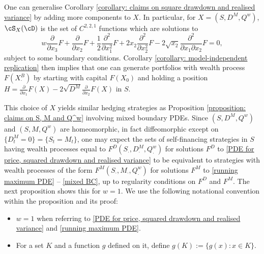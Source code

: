 \documentclass[11pt]{article}
\begin{document}
One can generalise Corollary \ref{corollary: claims on square drawdown and realised variance} by adding more components to $X$. In particular, for $X = (S, D^M, Q^w)$, $\cS_X(\cD)$ is the set of $C^{2,2,1}$ functions which are solutions to
\begin{equation}
\label{PDE for price, squared drawdown and realised variance}
w \frac{\partial}{\partial x_3} F + \frac{\partial}{\partial x_2} F + \frac{1}{2} \frac{\partial^2}{\partial x_1^2}F + 2 x_2 \frac{\partial^2}{\partial x_2^2} F - 2 \sqrt{x_2} \frac{\partial^2}{\partial x_1 \partial x_2} F = 0,
\end{equation}
subject to some boundary conditions. Corollary \ref{corollary: model-independent replication} then implies that one can generate portfolios with wealth process $F(X^B_\cdot)$ by starting with capital $F(X_0)$ and holding a position $H = \frac{\partial}{\partial x_1} F(X) - 2 \sqrt{D^M} \frac{\partial}{\partial x_2} F(X)$ in $S$. 

This choice of $X$ yields similar hedging strategies as Proposition \ref{proposition: claims on S, M and Q^w} involving mixed boundary PDEs. Since $(S, D^M, Q^w)$ and $(S, M, Q^w)$ are homeomorphic, in fact diffeomorphic except on $\{ D^M_t = 0 \} = \{ S_t = M_t \}$, one may expect the sets of self-financing strategies in $S$ having wealth processes equal to $F^D(S_\cdot, D^M_\cdot, Q^w_\cdot)$ for solutions $F^D$ to \eqref{PDE for price, squared drawdown and realised variance} to be equivalent to strategies with wealth processes of the form $F^M(S_\cdot, M_\cdot, Q^w_\cdot)$ for solutions $F^M$ to \eqref{running maximum PDE} -- \eqref{mixed BC}, up to regularity conditions on $F^D$ and $F^M$. The next proposition shows this for $w = 1$. We use the following notational convention within the proposition and its proof:
\begin{itemize}
\item $w = 1$ when referring to \eqref{PDE for price, squared drawdown and realised variance} and \eqref{running maximum PDE}.
\item For a set $K$ and a function $g$ defined on it, define $g(K) := \{ g(x): x \in K \}$. 
\end{itemize}
\end{document}

